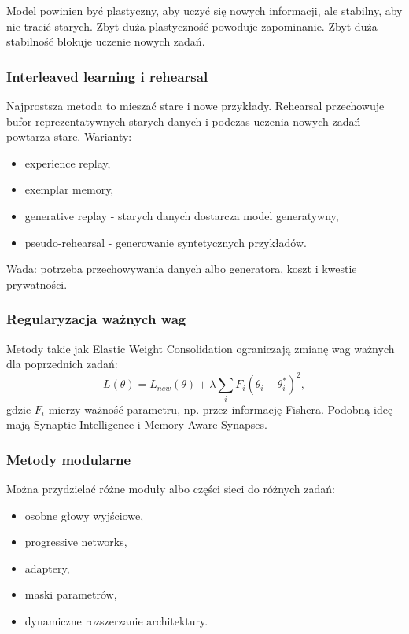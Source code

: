 Model powinien być plastyczny, aby uczyć się nowych informacji, ale stabilny, aby nie tracić starych. Zbyt duża plastyczność powoduje zapominanie. Zbyt duża stabilność blokuje uczenie nowych zadań.

\subsubsection{Interleaved learning i rehearsal}

Najprostsza metoda to mieszać stare i nowe przykłady. Rehearsal przechowuje bufor reprezentatywnych starych danych i podczas uczenia nowych zadań powtarza stare. Warianty:
\begin{itemize}
  \item experience replay,
  \item exemplar memory,
  \item generative replay - starych danych dostarcza model generatywny,
  \item pseudo-rehearsal - generowanie syntetycznych przykładów.
\end{itemize}

Wada: potrzeba przechowywania danych albo generatora, koszt i kwestie prywatności.

\subsubsection{Regularyzacja ważnych wag}

Metody takie jak Elastic Weight Consolidation ograniczają zmianę wag ważnych dla poprzednich zadań:
\[
L(\theta)=L_{new}(\theta)+\lambda\sum_i F_i(\theta_i-\theta_i^*)^2,
\]
gdzie $F_i$ mierzy ważność parametru, np. przez informację Fishera. Podobną ideę mają Synaptic Intelligence i Memory Aware Synapses.

\subsubsection{Metody modularne}

Można przydzielać różne moduły albo części sieci do różnych zadań:
\begin{itemize}
  \item osobne głowy wyjściowe,
  \item progressive networks,
  \item adaptery,
  \item maski parametrów,
  \item dynamiczne rozszerzanie architektury.
\end{itemize}

